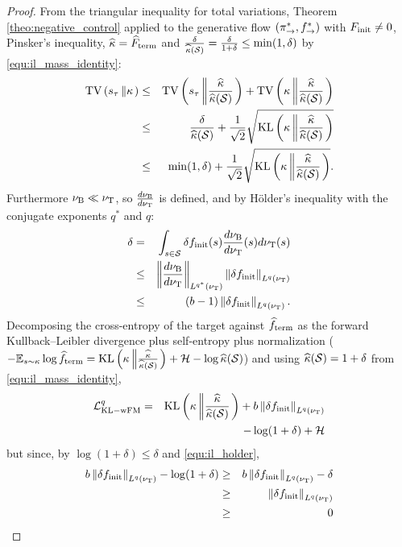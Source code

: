 \begin{proof}
    From the triangular inequality for total variations, Theorem \ref{theo:negative_control} applied to the generative flow $(\pi_{\rightarrow}^*,f^*_{\rightarrow})$ with $F_{\mathrm{init}}\neq0$, Pinsker's inequality, $\widehat {\kappa} = \widehat{F}_{\mathrm{term}}$ and $\frac{\delta}{\widehat{\kappa}(\mathcal S)} = \frac{\delta}{1+\delta}\leq\min(1,\delta)$ by \eqref{equ:il_mass_identity}:
    \begin{eqnarray}
        \mathrm{TV}\left(s_\tau \left\| \kappa \right.\right)  &\leq&  \mathrm{TV}\left(s_\tau \left\| \frac{\widehat{\kappa}}{\widehat{\kappa}(\mathcal S)} \right.\right)  +  \mathrm{TV}\left(\kappa\left\| \frac{\widehat{\kappa}}{\widehat{\kappa}(\mathcal S)} \right.\right)   \nonumber\\
        &\leq & \frac{\delta}{\widehat {\kappa}(\mathcal S)} +  \frac{1}{\sqrt{2}}\sqrt{\mathrm{KL}\left(\kappa\left\|  \frac{\widehat{\kappa}}{\widehat{\kappa}(\mathcal S)}\right. \right)} \nonumber\\
        &\leq & \min(1,\delta) +  \frac{1}{\sqrt{2}}\sqrt{\mathrm{KL}\left(\kappa\left\|  \frac{\widehat{\kappa}}{\widehat{\kappa}(\mathcal S)}\right. \right)}. \label{equ:il_tv_split}
    \end{eqnarray}
    Furthermore $\nu_{\mathrm{B}}\ll\nu_{\mathrm{T}}$, so $\frac{d\nu_{\mathrm{B}}}{d\nu_{\mathrm{T}}}$ is defined, and by H\"older's inequality with the conjugate exponents $q^*$ and $q$:
    \begin{eqnarray}
        \delta &=& \int_{s\in \mathcal S }\delta f_{\mathrm{init}}(s)\frac{d\nu_{\mathrm{B}}}{d\nu_{\mathrm{T}}}(s)d\nu_{\mathrm{T}}(s)\nonumber\\
        &\leq& \left\|\frac{d\nu_{\mathrm{B}}}{d\nu_{\mathrm{T}}}\right\|_{L^{q^*}(\nu_{\mathrm{T}})}\left\|\delta f_{\mathrm{init}}\right\|_{L^{q}(\nu_{\mathrm{T}})} \nonumber\\
        &\leq& (b-1)\left\|\delta f_{\mathrm{init}}\right\|_{L^{q}(\nu_{\mathrm{T}})}. \label{equ:il_holder}
    \end{eqnarray}
    Decomposing the cross-entropy of the target against $\widehat{f}_{\mathrm{term}}$ as the forward Kullback--Leibler divergence plus self-entropy plus normalization ($-\mathbb E_{s\sim\kappa}\log\widehat{f}_{\mathrm{term}} = \mathrm{KL}\left(\kappa\left\|\frac{\widehat{\kappa}}{\widehat{\kappa}(\mathcal S)}\right.\right) + \mathcal H - \log\widehat{\kappa}(\mathcal S)$) and using $\widehat{\kappa}(\mathcal S) = 1+\delta$ from \eqref{equ:il_mass_identity},
        \begin{eqnarray}
        \mathcal L_{\mathrm{KL-wFM}}^q  &=&\mathrm{KL}\left(\kappa\left\| \frac{\widehat{\kappa}}{\widehat{\kappa}(\mathcal S)}\right. \right)  + b\left\|\delta f_{\mathrm{init}}\right\|_{L^{q}(\nu_{\mathrm{T}})} \nonumber\\ && \quad - \log(1+\delta)+ \mathcal H\label{eq:wFM_strong_bound}
    \end{eqnarray}
 but since, by $\log(1+\delta)\leq\delta$ and \eqref{equ:il_holder},
 \begin{eqnarray}
 b\left\|\delta f_{\mathrm{init}}\right\|_{L^{q}(\nu_{\mathrm{T}})} - \log(1+\delta) &\geq& b\left\|\delta f_{\mathrm{init}}\right\|_{L^{q}(\nu_{\mathrm{T}})} -\delta \nonumber\\ &\geq& \left\|\delta f_{\mathrm{init}}\right\|_{L^{q}(\nu_{\mathrm{T}})} \nonumber\\&\geq& 0   \label{eq:lp_delta}
 \end{eqnarray}


\end{proof}
